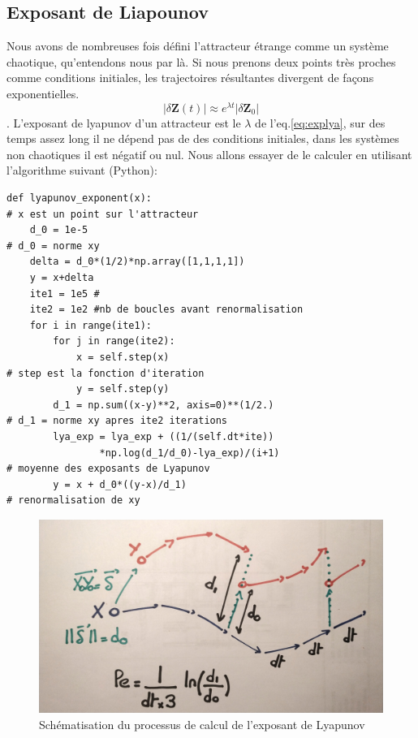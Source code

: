 \documentclass{wsdcr}
\begin{document}
\subsection{Exposant de Liapounov}
Nous avons de nombreuses fois défini l'attracteur étrange comme un système chaotique, qu'entendons nous par là. Si nous prenons deux points très proches comme conditions initiales, les trajectoires résultantes divergent de façons exponentielles.
\begin{equation}
|\delta \mathbf {Z} (t)|\approx e^{\lambda t}|\delta \mathbf {Z} _{0}|
\label{eq:explya}
\end{equation}. L'exposant de lyapunov d'un attracteur est le $\lambda$ de l'eq.\ref{eq:explya}, sur des temps assez long il ne dépend pas de des conditions initiales, dans les systèmes non chaotiques il est négatif ou nul. Nous allons essayer de le calculer en utilisant l'algorithme suivant (Python): 
\begin{lstlisting}
def lyapunov_exponent(x):
# x est un point sur l'attracteur
	d_0 = 1e-5
# d_0 = norme xy
	delta = d_0*(1/2)*np.array([1,1,1,1])
	y = x+delta 
	ite1 = 1e5 #
	ite2 = 1e2 #nb de boucles avant renormalisation
    for i in range(ite1):
        for j in range(ite2):
            x = self.step(x)
# step est la fonction d'iteration
            y = self.step(y)  
        d_1 = np.sum((x-y)**2, axis=0)**(1/2.)
# d_1 = norme xy apres ite2 iterations
        lya_exp = lya_exp + ((1/(self.dt*ite))
        		*np.log(d_1/d_0)-lya_exp)/(i+1)
# moyenne des exposants de Lyapunov
        y = x + d_0*((y-x)/d_1)
# renormalisation de xy
\end{lstlisting}
\begin{figure}
    \centering
    \includegraphics[width=\linewidth]{fig/dessinLE.jpg}
    \caption{Schématisation du processus de calcul de l'exposant de Lyapunov}
    \label{fig:dessinLE}
\end{figure}
\end{document}
